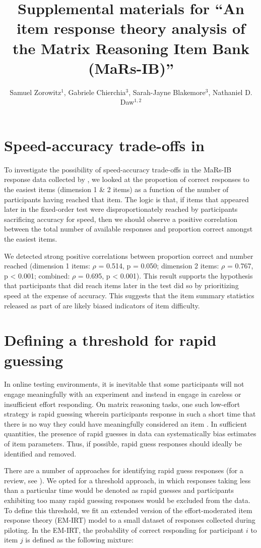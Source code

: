 \documentclass[a4paper,man,natbib]{apa6}
\title{Supplemental materials for ``An item response theory analysis of the Matrix Reasoning Item Bank (MaRs-IB)''}
\author{Samuel Zorowitz$^1$, Gabriele Chierchia$^3$, Sarah-Jayne Blakemore$^3$, Nathaniel D. Daw$^{1,2}$}
\affiliation{$^1$Princeton Neuroscience Institute, Princeton University, USA\\$^2$Department of Psychology, Princeton University, USA\\$^3$Department of Psychology, University of Cambridge, Downing Street, Cambridge, UK}
\begin{document}
\maketitle

\section*{Speed-accuracy trade-offs in \cite{chierchia2019matrix}}

To investigate the possibility of speed-accuracy trade-offs in the MaRs-IB response data collected by \cite{chierchia2019matrix}, we looked at the proportion of correct responses to the easiest items (dimension 1 \& 2 items) as a function of the number of participants having reached that item. The logic is that, if items that appeared later in the fixed-order test were disproportionately reached by participants sacrificing accuracy for speed, then we should observe a positive correlation between the total number of available responses and proportion correct amongst the easiest items. 

We detected strong positive correlations between proportion correct and number reached (dimension 1 items: $\rho$ = 0.514, p = 0.050; dimension 2 items: $\rho$ = 0.767, p < 0.001; combined: $\rho$ = 0.695, p < 0.001). This result supports the hypothesis that participants that did reach items later in the test did so by prioritizing speed at the expense of accuracy. This suggests that the item summary statistics released as part of \cite{chierchia2019matrix} are likely biased indicators of item difficulty.

\section{Defining a threshold for rapid guessing}

In online testing environments, it is inevitable that some participants will not engage meaningfully with an experiment and instead in engage in careless or insufficient effort responding. On matrix reasoning tasks, one such low-effort strategy is rapid guessing wherein participants response in such a short time that there is no way they could have meaningfully considered an item \citep{wise2017rapid}. In sufficient quantities, the presence of rapid guesses in data can systematically bias estimates of item parameters. Thus, if possible, rapid guess responses should ideally be identified and removed. 

There are a number of approaches for identifying rapid guess responses (for a review, see \cite{wise2017rapid}). We opted for a threshold approach, in which responses taking less than a particular time would be denoted as rapid guesses and participants exhibiting too many rapid guessing responses would be excluded from the data. To define this threshold, we fit an extended version of the effort-moderated item response theory (EM-IRT) model \citep{wise2006application} to a small dataset of responses collected during piloting. In the EM-IRT, the probability of correct responding for participant $i$ to item $j$ is defined as the following mixture:
\end{document}
